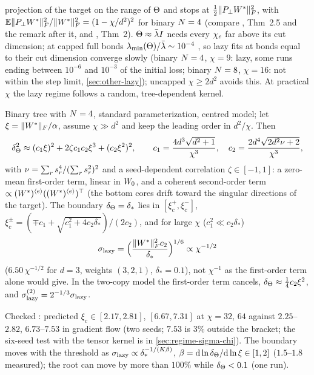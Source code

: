 projection of the target on the range of $\Theta$ and stops at $\frac12\lVert P_\perp W^{*}\rVert_{F}^2$, with
$\mathbb{E}\lVert P_\perp W^{*}\rVert_{F}^2/\lVert W^{*}\rVert_{F}^2=(1-\chi/d^2)^2$ for binary $\Ns=4$ (compare \citealp{chizat2019lazy}, Thm~2.5
and the remark after it, and \citealp{ghorbani2019limitations}, Thm~2). $\Theta\approx\bar\lambda I$ needs every $\chi_{e}$
far above its cut dimension; at
capped full bonds $\lambda_{\min}(\Theta)/\bar\lambda\sim10^{-4}$ \empirical, so lazy fits at bonds equal to their cut
dimension converge slowly (binary $\Ns=4$, $\chi=9$: lazy, some runs ending between $10^{-6}$ and $10^{-3}$ of the
initial loss; binary $N=8$, $\chi=16$: not within the step limit, \cref{sec:other-lazy}); uncapped $\chi\ge2d^2$
avoids this. At practical $\chi$ the lazy regime follows a random, tree-dependent kernel.

\begin{proposition}[Lazy boundary of the centred model, $\Ns=4$]\label{prop:A-lazy}
  \derived{} 
  Binary tree with $\Ns=4$, standard parameterization, centred model; let $\xi=\lVert W^{*}\rVert_{F}/\alpha$, assume
  $\chi\gg d^2$ and keep the leading order in $d^2/\chi$. Then
  \begin{equation}\label{eq:A-lazy-dk}
    \delta_{\Theta}^2\approx(c_1\xi)^2+2\zeta c_1c_2\xi^3+(c_2\xi^2)^2,\qquad
    c_1=\frac{4d^3\sqrt{d^2+1}}{\chi^3},\quad c_2=\frac{2d^4\sqrt{2d^2\nu+2}}{\chi^3},
  \end{equation}
  with $\nu=\sum_rs_{r}^4/(\sum_rs_{r}^2)^2$ and a seed-dependent correlation $\zeta\in[-1,1]$: a zero-mean first-order
  term, linear in $W_{0}$, and a coherent second-order term $\propto(W^{*})^{\langle e\rangle}((W^{*})^{\langle e\rangle})^{\top}$ (the bottom cores drift
  toward the singular directions of the target). The boundary $\delta_{\Theta}=\delta_*$ lies in $[\xi_c^+,\xi_c^-]$,
  $\xi_c^\pm=(\mp c_1+\sqrt{c_1^2+4c_2\delta_*})/(2c_2)$, and for large $\chi$ ($c_1^2\ll c_2\delta_*$)
  \begin{equation}\label{eq:A-sigma-lazy}
    \sigma_{\rm lazy}=\Big(\frac{\lVert W^{*}\rVert_{F}^2c_2}{\delta_*}\Big)^{1/6}\propto\chi^{-1/2}
  \end{equation}
  ($6.50\,\chi^{-1/2}$ for $d=3$, weights $(3,2,1)$, $\delta_*=0.1$), not $\chi^{-1}$ as the first-order term alone
  would give. In the two-copy model the first-order term cancels, $\delta_{\Theta}\approx\frac14c_2\xi^2$, and
  $\sigma^{(2)}_{\rm lazy}=2^{-1/3}\sigma_{\rm lazy}$.
\end{proposition}
Checked \empirical: predicted $\xi_c\in[2.17,2.81]$, $[6.67,7.31]$ at $\chi=32$, $64$ against $2.25$--$2.82$, $6.73$--$7.53$ in
gradient flow (two seeds; $7.53$ is $3\%$ outside the bracket; the six-seed test with the tensor kernel is in
\cref{sec:regime-sigma-chi}). The boundary moves with the threshold as $\sigma_{\rm lazy}\propto\delta_*^{-1/(K\beta)}$,
$\beta=\mathrm{d}\ln\delta_{\Theta}/\mathrm{d}\ln\xi\in[1,2]$ ($1.5$--$1.8$ measured); the root can move by more than $100\%$ while
$\delta_{\Theta}<0.1$ (one run).

